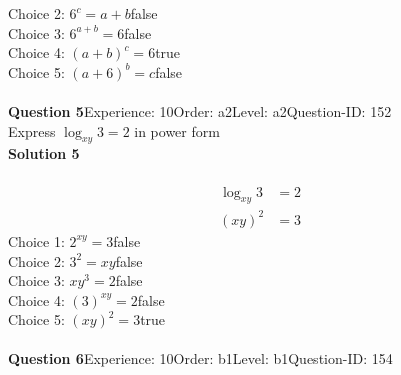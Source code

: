 \documentclass{article}
\begin{document}
Choice 2: \hspace{20pt}$6^c=a+b$\hspace{20pt}false\\
Choice 3: \hspace{20pt}$6^{a+b}=6$\hspace{20pt}false\\
Choice 4: \hspace{20pt}$(a+b)^c=6$\hspace{20pt}true\\
Choice 5: \hspace{20pt}$(a+6)^b=c$\hspace{20pt}false\\
\\[4pt]
\noindent\textbf{Question 5}\hspace{20pt}Experience: 10\hspace{20pt}Order: a2\hspace{20pt}Level: a2\hspace{20pt}Question-ID: 152\\[2pt]
Express $\log_{xy}3=2$ in power form\\[4pt]
\noindent\textbf{Solution 5}\\[2pt]
\\[-35pt]\begin{align*}
\log_{xy}3&=2\\[2pt]
(xy)^2&=3
\end{align*}
Choice 1: \hspace{20pt}$2^{xy}=3$\hspace{20pt}false\\
Choice 2: \hspace{20pt}$3^2=xy$\hspace{20pt}false\\
Choice 3: \hspace{20pt}$xy^{3}=2$\hspace{20pt}false\\
Choice 4: \hspace{20pt}$(3)^{xy}=2$\hspace{20pt}false\\
Choice 5: \hspace{20pt}$(xy)^2=3$\hspace{20pt}true\\
\\[4pt]
\noindent\textbf{Question 6}\hspace{20pt}Experience: 10\hspace{20pt}Order: b1\hspace{20pt}Level: b1\hspace{20pt}Question-ID: 154\\[2pt]
\end{document}

